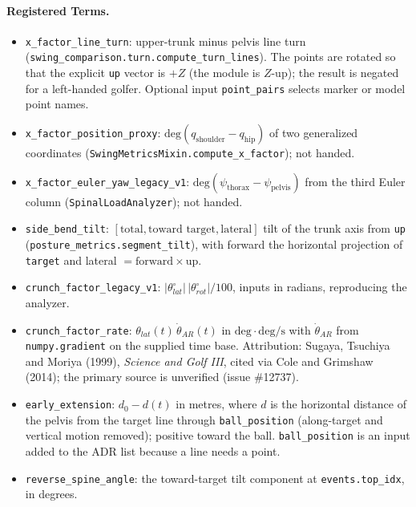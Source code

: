 \paragraph{Registered Terms.}
\begin{itemize}
  \item \texttt{x\_factor\_line\_turn}: upper-trunk minus pelvis line turn
    (\texttt{swing\_comparison.turn.compute\_turn\_lines}). The points are
    rotated so that the explicit \texttt{up} vector is $+Z$ (the module is
    $Z$-up); the result is negated for a left-handed golfer. Optional input
    \texttt{point\_pairs} selects marker or model point names.
  \item \texttt{x\_factor\_position\_proxy}: $\mathrm{deg}(q_{\mathrm{shoulder}}-q_{\mathrm{hip}})$
    of two generalized coordinates (\texttt{SwingMetricsMixin.compute\_x\_factor});
    not handed.
  \item \texttt{x\_factor\_euler\_yaw\_legacy\_v1}:
    $\mathrm{deg}(\psi_{\mathrm{thorax}}-\psi_{\mathrm{pelvis}})$ from the third
    Euler column (\texttt{SpinalLoadAnalyzer}); not handed.
  \item \texttt{side\_bend\_tilt}: $[\text{total},\text{toward target},\text{lateral}]$
    tilt of the trunk axis from \texttt{up} (\texttt{posture\_metrics.segment\_tilt}),
    with forward the horizontal projection of \texttt{target} and lateral
    $=\mathrm{forward}\times\mathrm{up}$.
  \item \texttt{crunch\_factor\_legacy\_v1}: $|\theta_{lat}^\circ|\,|\theta_{rot}^\circ|/100$,
    inputs in radians, reproducing the analyzer.
  \item \texttt{crunch\_factor\_rate}: $\theta_{lat}(t)\,\dot\theta_{AR}(t)$ in
    $\mathrm{deg}\cdot\mathrm{deg/s}$ with $\dot\theta_{AR}$ from
    \texttt{numpy.gradient} on the supplied time base. Attribution: Sugaya,
    Tsuchiya and Moriya (1999), \emph{Science and Golf III}, cited via Cole and
    Grimshaw (2014); the primary source is unverified (issue \#12737).
  \item \texttt{early\_extension}: $d_0-d(t)$ in metres, where $d$ is the
    horizontal distance of the pelvis from the target line through
    \texttt{ball\_position} (along-target and vertical motion removed);
    positive toward the ball. \texttt{ball\_position} is an input added to the
    ADR list because a line needs a point.
  \item \texttt{reverse\_spine\_angle}: the toward-target tilt component at
    \texttt{events.top\_idx}, in degrees.
\end{itemize}

